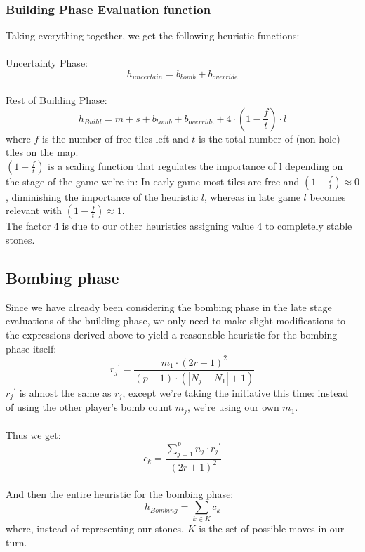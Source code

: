 \subsubsection{Building Phase Evaluation function}
Taking everything together, we get the following heuristic functions: \\
\\
Uncertainty Phase: \\
\[h_{uncertain} = b_{bomb} + b_{override} \]
\\
Rest of Building Phase: \\
\[ h_{Build} = m + s + b_{bomb} + b_{override} + 4 \cdot (1-\frac{f}{t}) \cdot l \]
where $f$ is the number of free tiles left and $t$ is the total number of (non-hole) tiles on the map. \\
$(1-\frac{f}{t})$ is a scaling function that regulates the importance of l depending on the stage of the game we're in: In early game most tiles are free and $(1-\frac{f}{t}) \approx 0$, diminishing the importance of the heuristic $l$, whereas in late game $l$ becomes relevant with $(1-\frac{f}{t}) \approx 1$. \\
The factor 4 is due to our other heuristics assigning value 4 to completely stable stones.




\subsection{Bombing phase}
Since we have already been considering the bombing phase in the late stage evaluations of the building phase, we only need to make slight modifications to the expressions derived above to yield a reasonable heuristic for the bombing phase itself: \\
\[{r_j}^{\prime} = \frac{m_1 \cdot (2r+1)^2}{(p-1) \cdot (|N_j - N_1| + 1)} \]
${r_j}^{\prime}$ is almost the same as $r_j$, except we're taking the initiative this time: instead of using the other player's bomb count $m_j$, we're using our own $m_1$. \\
\\
Thus we get: \\
\[c_k = \frac{\sum\limits_{j=1}^p n_j \cdot {r_j}^{\prime}}{(2r+1)^2}\]
\\
And then the entire heuristic for the bombing phase: \\
\[ h_{Bombing} = \sum\limits_{k \in K} c_k \]
where, instead of representing our stones, $K$ is the set of possible moves in our turn.